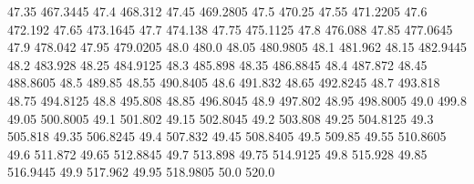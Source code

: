           47.35         467.3445
           47.4          468.312
          47.45         469.2805
           47.5           470.25
          47.55         471.2205
           47.6          472.192
          47.65         473.1645
           47.7          474.138
          47.75         475.1125
           47.8          476.088
          47.85         477.0645
           47.9          478.042
          47.95         479.0205
           48.0            480.0
          48.05         480.9805
           48.1          481.962
          48.15         482.9445
           48.2          483.928
          48.25         484.9125
           48.3          485.898
          48.35         486.8845
           48.4          487.872
          48.45         488.8605
           48.5           489.85
          48.55         490.8405
           48.6          491.832
          48.65         492.8245
           48.7          493.818
          48.75         494.8125
           48.8          495.808
          48.85         496.8045
           48.9          497.802
          48.95         498.8005
           49.0            499.8
          49.05         500.8005
           49.1          501.802
          49.15         502.8045
           49.2          503.808
          49.25         504.8125
           49.3          505.818
          49.35         506.8245
           49.4          507.832
          49.45         508.8405
           49.5           509.85
          49.55         510.8605
           49.6          511.872
          49.65         512.8845
           49.7          513.898
          49.75         514.9125
           49.8          515.928
          49.85         516.9445
           49.9          517.962
          49.95         518.9805
           50.0            520.0
